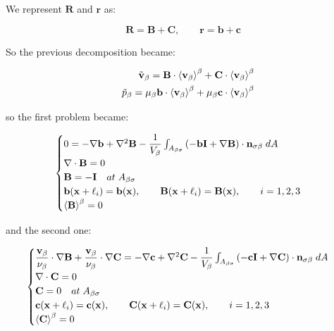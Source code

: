 We represent $\mathbf{R}$ and $\mathbf{r}$ as:

$$
 \mathbf{R} = \mathbf{B} + \mathbf{C}, \qquad \mathbf{r} = \mathbf{b} + \mathbf{c}
$$

So the previous decomposition became:

\begin{eqnarray}
	&& \tilde{\textbf{v}}_{\beta} = \mathbf{B} \cdot {\left< \textbf{v}_{\beta}\right>}^{\beta} + \mathbf{C} \cdot {\left< \textbf{v}_{\beta}\right>}^{\beta}  \\
	&& \tilde{p}_{\beta} = \mu_{\beta} \mathbf{b} \cdot {\left< \textbf{v}_{\beta}\right>}^{\beta} + \mu_{\beta} \mathbf{c} \cdot {\left< \textbf{v}_{\beta}\right>}^{\beta}
	\label{eq:closure_viab_divison}
\end{eqnarray}

so the first problem became:

\begin{eqnarray}
	\begin{cases}
		0 = -\nabla \mathbf{b} + \nabla^2 \mathbf{B} - \dfrac{1}{V_\beta} \int_{A_{\beta \sigma}}  \left(-\mathbf{b}\mathbf{I}  +  \nabla \mathbf{B} \right) \cdot \mathbf{n}_{\sigma \beta} \;dA  \\
		\nabla \cdot \mathbf{B} = 0  \\
		\mathbf{B} = -\mathbf{I} \quad at \; A_{\beta \sigma} \\
		\mathbf{b}(\mathbf{x} +\ell_i) = \mathbf{b}(\mathbf{x}), \qquad \mathbf{B}(\mathbf{x} +\ell_i) = \mathbf{B}(\mathbf{x}), \qquad i=1,2,3 \\
		{\left< \mathbf{B} \right>}^{\beta} = 0
	\end{cases}
\label{eq:B_problem}
\end{eqnarray}

and the second one:

\begin{eqnarray}
	\begin{cases}
		\dfrac{\textbf{v}_{\beta}}{\nu_{\beta}} \cdot  \nabla \mathbf{B} +\dfrac{\textbf{v}_{\beta}}{\nu_{\beta}} \cdot  \nabla \mathbf{C} = -\nabla \mathbf{c} +  \nabla^2 \mathbf{C} - \dfrac{1}{V_\beta} \int_{A_{\beta \sigma}}  \left(-\mathbf{c}\mathbf{I}  +  \nabla \mathbf{C} \right) \cdot \mathbf{n}_{\sigma \beta} \;dA  \\
		\nabla \cdot \mathbf{C} = 0  \\
		\mathbf{C} = 0 \quad at \; A_{\beta \sigma} \\
		\mathbf{c}(\mathbf{x} +\ell_i) = \mathbf{c}(\mathbf{x}), \qquad \mathbf{C}(\mathbf{x} +\ell_i) = \mathbf{C}(\mathbf{x}), \qquad i=1,2,3 \\
		{\left< \mathbf{C} \right>}^{\beta} = 0
	\end{cases}
\label{eq:C_problem}
\end{eqnarray}


